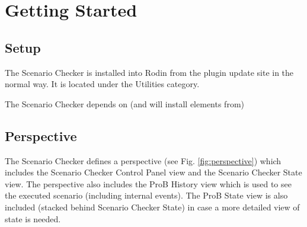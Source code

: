 \section{Getting Started}
\label{sec:getting-started}

\subsection{Setup}
\label{sec:setup}

The Scenario Checker is installed into Rodin from the plugin update site in the normal way.
It is located under the Utilities category.

The Scenario Checker depends on (and will install elements from)

\subsection{Perspective}
\label{sec:perspective}

The Scenario Checker defines a perspective (see Fig. \ref{fig:perspective}) which includes the Scenario Checker Control Panel view and the Scenario Checker State view.
The perspective also includes the ProB History view which is used to see the executed scenario (including internal events). 
The ProB State view is also included (stacked behind Scenario Checker State) in case a more detailed view of state is needed.


